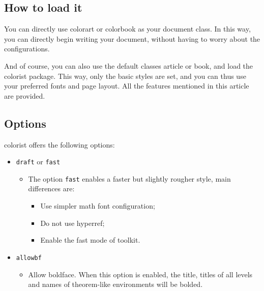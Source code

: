 \documentclass[allowbf,puretext]{colorart}
\theoremstyle{basic}
\theoremstyle{emphasis}
\theoremstyle{simple}
\providecommand{\colorist}{{\normalfont\textsf{colorist}}}
\providecommand{\colorart}{{\normalfont\textsf{colorart}}}
\providecommand{\colorbook}{{\normalfont\textsf{colorbook}}}
\begin{document}
\subsection{How to load it}
You can directly use \colorart{} or \colorbook{} as your document class. In this way, you can directly begin writing your document, without having to worry about the configurations.


And of course, you can also use the default classes \textsf{article} or \textsf{book}, and load the \colorist{} package. This way, only the basic styles are set, and you can thus use your preferred fonts and page layout. All the features mentioned in this article are provided.
\begin{code}
  \usepackage{colorist}
\end{code}

\subsection{Options}

\colorist{} offers the following options: 

\begin{itemize}
    \item \texttt{draft} or \texttt{fast}
        \begin{itemize}
            \item The option \verb|fast| enables a faster but slightly rougher style, main differences are:
            \begin{itemize}
                \item Use simpler math font configuration; 
                \item Do not use hyperref; 
                \item Enable the fast mode of \ProjLib{} toolkit.
            \end{itemize}
        \end{itemize}
    \item \texttt{allowbf}
        \begin{itemize}
            \item Allow boldface. When this option is enabled, the title, titles of all levels and names of theorem-like environments will be bolded.
        \end{itemize}
\end{itemize}
\end{document}
